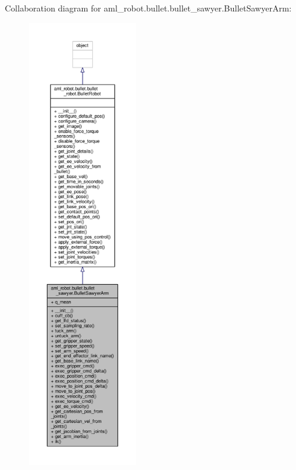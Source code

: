 Collaboration diagram for aml\-\_\-robot.\-bullet.\-bullet\-\_\-sawyer.\-Bullet\-Sawyer\-Arm\-:
\nopagebreak
\begin{figure}[H]
\begin{center}
\leavevmode
\includegraphics[height=550pt]{classaml__robot_1_1bullet_1_1bullet__sawyer_1_1_bullet_sawyer_arm__coll__graph}
\end{center}
\end{figure}
